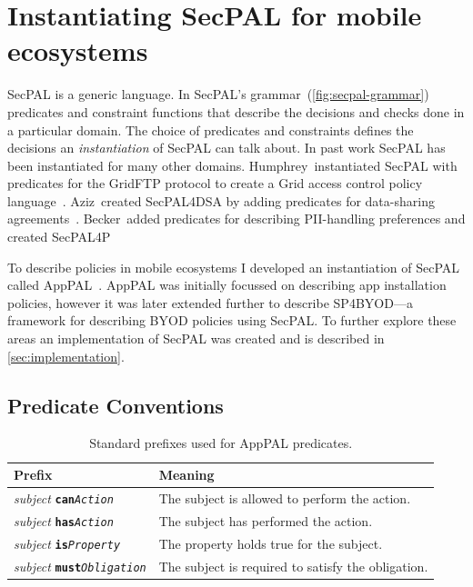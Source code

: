 \documentclass[thesis.tex]{subfiles}
\begin{document}
\section{Instantiating SecPAL for mobile ecosystems}
\label{sec:instantiating}

SecPAL is a generic language.
In SecPAL's grammar~(\autoref{fig:secpal-grammar}) predicates and constraint functions that describe the decisions and checks done in a particular domain.
The choice of predicates and constraints defines the decisions an \emph{instantiation} of SecPAL can talk about.
In past work SecPAL has been instantiated for many other domains.
Humphrey~\etal instantiated SecPAL with predicates for the GridFTP protocol to create a Grid access control policy language~\cite{humphrey_fine-grained_2007}.
Aziz~\etal created SecPAL4DSA by adding predicates for data-sharing agreements~\cite{aziz_secpal4dsa:_2011}.
Becker~\etal added predicates for describing \ac{PII}-handling preferences and created SecPAL4P~\cite{becker_framework_2009}

To describe policies in mobile ecosystems I developed an instantiation of SecPAL called AppPAL~\cite{hallett_apppal_2016}.
AppPAL was initially focussed on describing app installation policies, however it was later extended further to describe SP4BYOD---a framework for describing BYOD policies using SecPAL.
To further explore these areas an implementation of SecPAL was created and is described in \autoref{sec:implementation}.

\subsection{Predicate Conventions}
\label{ssec:types}

\newcommand{\descPred}[2]{\emph{subject} \texttt{\textbf{#1}\emph{#2}}}
\begin{table}
  \begin{tabular}{l l}
    \toprule
    Prefix                      & Meaning                                            \\
    \midrule
    \descPred{can}{Action}      & The subject is allowed to perform the action.      \\
    \descPred{has}{Action}      & The subject has performed the action.              \\
    \descPred{is}{Property}     & The property holds true for the subject.           \\
    \descPred{must}{Obligation} & The subject is required to satisfy the obligation. \\
    \bottomrule
  \end{tabular}
  \caption{Standard prefixes used for AppPAL predicates.}
  \label{tab:predicate-prefixes}
\end{table}
\end{document}
